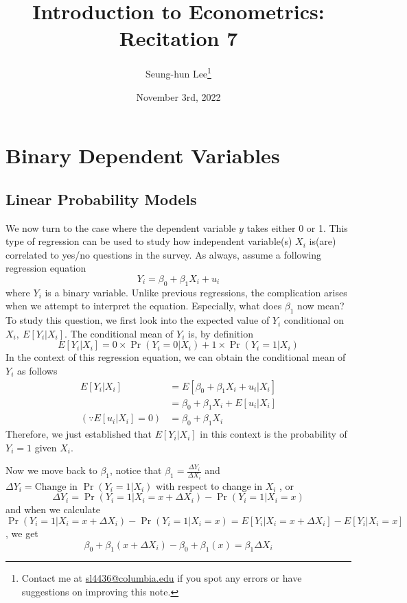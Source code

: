 \documentclass[12pt]{article}
\title{Introduction to Econometrics: Recitation 7}
\theoremstyle{definition}
\theoremstyle{property}
\theoremstyle{assumption}
\theoremstyle{example}
\theoremstyle{comment}
\begin{document}
\linespread{1.25}
\onehalfspacing

\author{Seung-hun Lee\footnote{Contact me at \href{mailto:sl4436@columbia.edu}{sl4436@columbia.edu} if you spot any errors or have suggestions on improving this note.}}
\date{November 3rd, 2022}
\maketitle
\thispagestyle{firstpage}

\section{Binary Dependent Variables}
\subsection{Linear Probability Models}
We now turn to the case where the dependent variable $y$ takes either 0 or 1. This type of regression can be used to study how independent variable(s) $X_i$ is(are) correlated to yes/no questions in the survey. As always, assume a following regression equation
\[
Y_i = \beta_0 + \beta_1 X_i +u_i
\]
where $Y_i$ is a binary variable.  Unlike previous regressions, the complication arises when we attempt to interpret the equation. Especially, what does $\beta_1$ now mean? To study this question, we first look into the expected value of $Y_i$ conditional on $X_i,\ E[Y_i|X_i]$. The conditional mean of $Y_i$ is, by definition
\[
E[Y_i|X_i] = 0\times\Pr(Y_i=0|X_i)+1\times\Pr(Y_i=1|X_i)
\]
In the context of this regression equation, we can obtain the conditional mean of $Y_i$ as follows
\[
\begin{aligned}
E[Y_i|X_i]&=E[\beta_0+\beta_1X_i+u_i|X_i]\\
&=\beta_0 + \beta_1X_i + E[u_i|X_i]\\
(\because  E[u_i|X_i]=0)&=\beta_0 + \beta_1X_i 
\end{aligned}
\]
Therefore, we just established that $E[Y_i|X_i]$ in this context is the probability of $Y_i=1$ given $X_i$. \par\medskip
Now we move back to $\beta_1$, notice that $\beta_1 =\frac{\Delta Y_i}{\Delta X_i}$ and $\Delta Y_i = \text{Change in }\Pr(Y_i=1|X_i)$ with respect to change in $X_i$ , or
\[
\Delta Y_i = \Pr(Y_i=1|X_i=x+\Delta X_i)-\Pr(Y_i=1|X_i=x)
\]
and when we calculate $\Pr(Y_i=1|X_i=x+\Delta X_i)-\Pr(Y_i=1|X_i=x)=E[Y_i|X_i=x+\Delta X_i]-E[Y_i|X_i=x]$, we get
\[
\beta_0+\beta_1(x+\Delta X_i)-\beta_0+\beta_1(x) =\beta_1 \Delta X_i
\]
\end{document}
